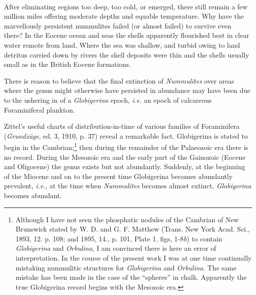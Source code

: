 \documentclass[a4paper, 12pt, oneside]{article}
\begin{document}
\paragraph{}
After eliminating regions too deep, too cold, or emerged, there still remain a few million miles offering moderate depths and equable temperature. Why have the marvellously persistent nummulites failed (or almost failed) to survive even there? In the Eocene ocean and seas the shells apparently flourished best in clear water remote from land. Where the sea was shallow, and turbid owing to land detritus carried down by rivers the shell deposits were thin and the shells usually small as in the British Eocene formations.

There is reason to believe that the final extinction of \emph{Nummulites} over areas where the genus might otherwise have persisted in abundance may have been due to the ushering in of a \emph{Globigerina} epoch, \emph{i.e.} an epoch of calcareous Foraminiferal plankton.

Zittel's useful charts of distribution-in-time of various families of Foraminifera (\emph{Grundzüge}, ed. 3, 1910, p. 37) reveal a remarkable fact. Globigerina is stated to begin in the Cambrian;\footnote{Although I have not seen the phosphatic nodules of the Cambrian of New Brunswick stated by W. D. and G. F. Matthew (Trans. New York Acad. Sci., 1893, 12. p. 108; and 1895, 14., p. 101, Plate 1. figs, 1-8\emph{b}) to contain \emph{Globigerina} and \emph{Orbulina}, I am convinced there is here an error of interpretation. In the course of the present work I was at one time continually mistaking nummulitic structures for \emph{Globigerina} and \emph{Orbulina}. The same mistake has been made in the case of the ``spheres'' in chalk. Apparently the true Globigerina record begins with the Mesozoic era.} then during the remainder of the Palaeozoic era there is no record. During the Mesozoic era and the early part of the Gainozoic (Eocene and Oligocene) the genus exists but not abundantly. Suddenly, at the beginning of the Miocene and on to the present time Globigerina becomes abundantly prevalent, \emph{i.e.}, at the time when \emph{Nummulites} becomes almost extinct, \emph{Globigerina} becomes abundant.
\end{document}
